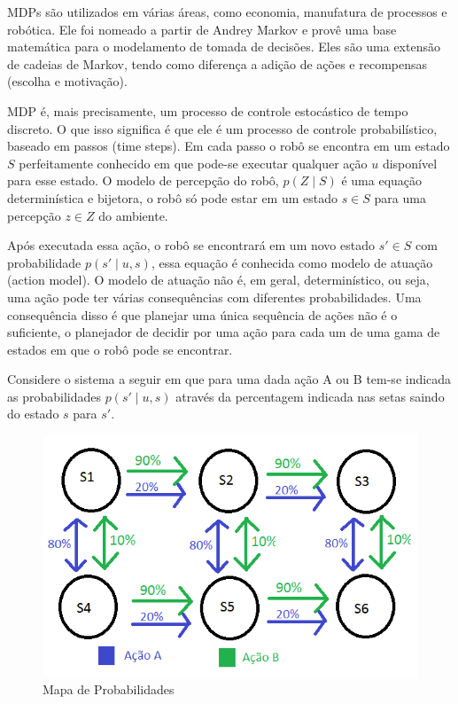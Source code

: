 MDPs são utilizados em várias áreas, como economia, manufatura de processos e robótica. Ele foi nomeado a partir de Andrey Markov e provê uma base matemática para o modelamento de tomada de decisões. Eles são uma extensão de cadeias de Markov, tendo como diferença a adição de ações e recompensas (escolha e motivação).

MDP é, mais precisamente, um processo de controle estocástico de tempo discreto. O que isso significa é que ele é um processo de controle probabilístico, baseado em passos (time steps). Em cada passo o robô se encontra em um estado $ S $ perfeitamente conhecido em que pode-se executar qualquer ação $ u $ disponível para esse estado. O modelo de percepção do robô, $ p \left( Z \mid S \right) $ é uma equação determinística e bijetora, o robô só pode estar em um estado $ s \in S $ para uma percepção $ z \in Z $ do ambiente.

Após executada essa ação, o robô se encontrará em um novo estado $ s' \in S $ com probabilidade $ p \left( s' \mid u, s \right) $, essa equação é conhecida como modelo de atuação (action model). O modelo de atuação não é, em geral, determinístico, ou seja, uma ação pode ter várias consequências com diferentes probabilidades. Uma consequência disso é que planejar uma única sequência de ações não é o suficiente, o planejador de decidir por uma ação para cada um de uma gama de estados em que o robô pode se encontrar.

Considere o sistema a seguir em que para uma dada ação A ou B tem-se indicada as probabilidades $ p \left( s' \mid u, s \right) $ através da percentagem indicada nas setas saindo do estado $ s $ para $ s' $.


\begin{figure}[h]
    \centering
    \includegraphics[width=120mm]{images/probabilidade-markov}
    \caption{\label{img:MapaDeProbabilidadesMarkov}Mapa de Probabilidades}
\end{figure}

